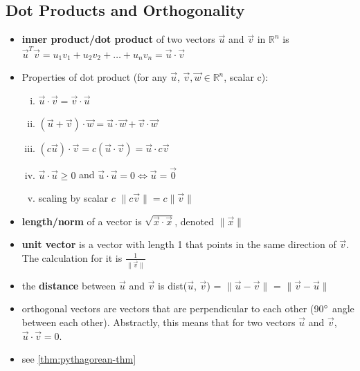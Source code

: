 \documentclass[a4paper,12pt]{article}
\theoremstyle{definition}
\theoremstyle{definition}
\newcommand{\finiteadd}[3]{#1 + #2 + \ldots + #3}
\newcommand{\dotprod}[2]{#1 \cdot #2}
\newcommand{\dotprodvecs}[2]{\dotprod{\vec{#1}}{\vec{#2}}}
\newcommand{\norm}[1]{\lVert #1 \rVert}
\newcommand{\normvec}[1]{\norm{\vec{#1}}}
\begin{document}
	\subsection{Dot Products and Orthogonality}
	\begin{itemize}
		\item \textbf{inner product/dot product} of two vectors $\vec{u}$ and $\vec{v}$ in $\mathbb{R}^n$ is $\vec{u}^T\vec{v} = \finiteadd{u_1v_1}{u_2v_2}{u_nv_n} = \dotprodvecs{u}{v}$
		
		\item Properties of dot product (for any $\vec{u}$, $\vec{v}, \vec{w} \in \mathbb{R}^n$, scalar c):
		\begin{enumerate}[i.]
			\item $\dotprodvecs{u}{v} = \dotprodvecs{v}{u}$
			
			\item $\dotprod{(\vec{u} + \vec{v})}{\vec{w}} = \dotprodvecs{u}{w} + \dotprodvecs{v}{w}$
			
			\item $\dotprod{(c\vec{u})}{\vec{v}} = c(\dotprod{\vec{u}}{\vec{v}}) = \dotprod{\vec{u}}{c\vec{v}}$
			
			\item $\dotprodvecs{u}{u} \geq 0$ and $\dotprodvecs{u}{u} = 0 \Leftrightarrow \vec{u} = \vec{0}$
			
			\item scaling by scalar $c$ $\norm{c\vec{v}} = c\normvec{v}$
		\end{enumerate}
		
		\item \textbf{length/norm} of a vector is $\sqrt{\dotprodvecs{x}{x}}$, denoted $\normvec{x}$
		
		\item \textbf{unit vector} is a vector with length 1 that points in the same direction of $\vec{v}$. The calculation for it is $\frac{1}{\normvec{v}}$
		
		\item the \textbf{distance} between $\vec{u}$ and $\vec{v}$ is dist($\vec{u}$, $\vec{v}$) = $\norm{\vec{u} - \vec{v}}$ = $\norm{\vec{v} - \vec{u}}$
		
		\item orthogonal vectors are vectors that are perpendicular to each other (90$\degree$ angle between each other). Abstractly, this means that for two vectors $\vec{u}$ and $\vec{v}$, $\dotprodvecs{u}{v} = 0$.
		
		\item see \autoref{thm:pythagorean-thm}
		

\end{itemize}
\end{document}
